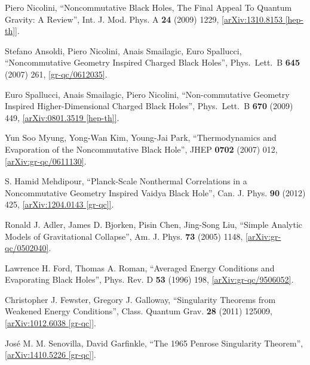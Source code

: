 \documentclass[12pt]{article}
\newcommand{\2}{$^2$}
\newcommand{\3}{$^3$}
\newcommand{\4}{$_4$}
\newcommand{\5}{$_5$}
\begin{document}
\begin{thebibliography}{400}
	Piero Nicolini, ``Noncommutative Black Holes, The Final Appeal To Quantum Gravity: A Review'', Int. J. Mod. Phys. A \textbf{24} (2009) 1229, \href{http://arxiv.org/abs/arXiv:1310.8153}{[arXiv:1310.8153 [hep-th]]}.
	
  Stefano Ansoldi, Piero Nicolini, Anais Smailagic, Euro Spallucci,
  ``Noncommutative Geometry Inspired Charged Black Holes'', 
  Phys.\ Lett.\ B {\bf 645} (2007) 261, \href{http://arxiv.org/abs/gr-qc/0612035}{[gr-qc/0612035]}.

 Euro Spallucci, Anais Smailagic, Piero Nicolini,
  ``Non-commutative Geometry Inspired Higher-Dimensional Charged Black Holes'',
  Phys.\ Lett.\ B {\bf 670} (2009) 449,  \href{http://arxiv.org/abs/0801.3519}{[arXiv:0801.3519 [hep-th]]}.

	Yun Soo Myung, Yong-Wan Kim, Young-Jai Park, ``Thermodynamics and Evaporation of the Noncommutative Black Hole'', JHEP \textbf{0702} (2007) 012, \href{http://arxiv.org/abs/gr-qc/0611130}{[arXiv:gr-qc/0611130]}.


	
	S. Hamid Mehdipour, ``Planck-Scale Nonthermal Correlations in a Noncommutative Geometry Inspired Vaidya Black Hole'',  	Can. J. Phys. \textbf{90} (2012) 425, \href{http://arxiv.org/abs/1204.0143}{[arXiv:1204.0143 [gr-qc]]}.
	
Ronald J. Adler, James D. Bjorken, Pisin Chen, Jing-Song Liu, ``Simple Analytic Models of Gravitational Collapse'', 
Am. J. Phys. \textbf{73} (2005) 1148, \href{http://arxiv.org/abs/gr-qc/0502040}{[arXiv:gr-qc/0502040]}.

Lawrence H. Ford, Thomas A. Roman, ``Averaged Energy Conditions and Evaporating Black Holes'', Phys. Rev. D \textbf{53} (1996) 198, \href{http://arxiv.org/abs/gr-qc/9506052v2}{[arXiv:gr-qc/9506052]}.

Christopher J. Fewster, Gregory J. Galloway, ``Singularity Theorems from Weakened Energy Conditions'', 	Class. Quantum Grav. \textbf{28} (2011) 125009, \href{http://arxiv.org/abs/1012.6038v3}{[arXiv:1012.6038 [gr-qc]]}.


Jos\'e M. M. Senovilla, David Garfinkle, ``The 1965 Penrose Singularity Theorem'', \href{http://arxiv.org/abs/1410.5226}{[arXiv:1410.5226 [gr-qc]]}.


\end{thebibliography}
\end{document}
